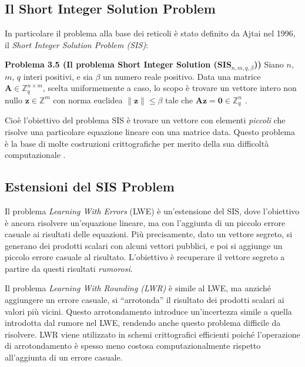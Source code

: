 \subsection{Il Short Integer Solution Problem}

In particolare il problema alla base dei reticoli è stato definito da Ajtai nel 1996, il \textit{Short Integer Solution Problem (SIS)}:
\begin{displayquote}[NIST IR 8413, 2022]
    \textbf{Problema 3.5 (Il problema Short Integer Solution (SIS$_{n,m,q,\beta}$))} 
Siano $n$, $m$, $q$ interi positivi, e sia $\beta$ un numero reale positivo. Data una matrice 
$\mathbf{A} \in \mathbb{Z}_q^{n \times m}$, scelta uniformemente a caso, lo scopo è trovare un vettore intero non nullo 
$\mathbf{z} \in \mathbb{Z}^m$ con norma euclidea $\|\mathbf{z}\| \leq \beta$ tale che $\mathbf{Az} = \mathbf{0} \in \mathbb{Z}_q^n$ \cite{NISTthirdReport}.
\end{displayquote}

Cioè l’obiettivo del problema SIS è trovare un vettore con elementi \textit{piccoli} che risolve una particolare equazione lineare con una matrice data. Questo problema è la base di molte costruzioni crittografiche per merito della sua difficoltà computazionale \cite{enisa-pqc}.

\subsection{Estensioni del SIS Problem}

Il problema \textit{Learning With Errors} (LWE) è un’estensione del SIS, dove l’obiettivo è ancora risolvere un’equazione lineare, ma con l’aggiunta di un piccolo errore casuale ai risultati delle equazioni. Più precisamente, dato un vettore segreto, si generano dei prodotti scalari con alcuni vettori pubblici, e poi si aggiunge un piccolo errore casuale al risultato. L’obiettivo è recuperare il vettore segreto a partire da questi risultati \textit{rumorosi}.

Il problema \textit{Learning With Rounding (LWR)} è simile al LWE, ma anziché aggiungere un errore casuale, si “arrotonda” il risultato dei prodotti scalari ai valori più vicini. Questo arrotondamento introduce un’incertezza simile a quella introdotta dal rumore nel LWE, rendendo anche questo problema difficile da risolvere. LWR viene utilizzato in schemi crittografici efficienti poiché l’operazione di arrotondamento è spesso meno costosa computazionalmente rispetto all’aggiunta di un errore casuale. 

